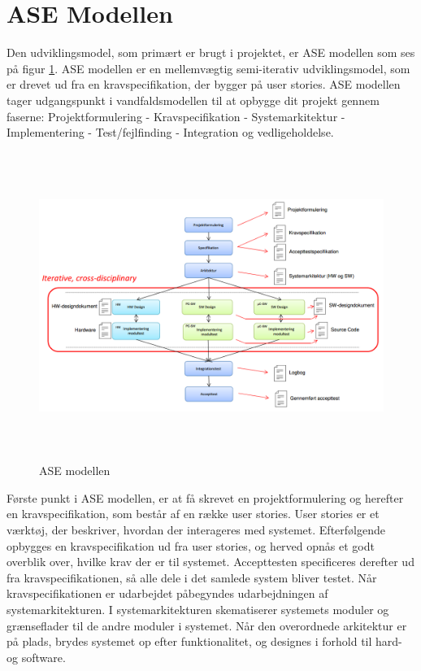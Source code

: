 \section{ASE Modellen} 
\noindent Den udviklingsmodel, som primært er brugt i projektet, er ASE modellen som ses på figur \ref{fig:ASE}. ASE modellen er en mellemvægtig semi-iterativ udviklingsmodel, som er drevet ud fra en kravspecifikation, der bygger på user stories. ASE modellen tager udgangspunkt i vandfaldsmodellen til at opbygge dit projekt gennem faserne: Projektformulering - Kravspecifikation - Systemarkitektur -  Implementering -  Test/fejlfinding -  Integration og vedligeholdelse.

\begin{figure} [!ht]
	\begin{center}
		\includegraphics[height=10cm, width=12cm]{Projektbeskrivelse/subpages/ASEModellen.png}
	\end{center}
	\caption{ASE modellen \cite{VejlUdvikl}}
	\label{fig:ASE}
\end{figure}

\noindent Første punkt i ASE modellen, er at få skrevet en projektformulering og herefter en kravspecifikation, som består af en række user stories. User stories er et værktøj, der beskriver, hvordan der interageres med systemet. Efterfølgende opbygges en kravspecifikation ud fra user stories, og herved opnås et godt overblik over, hvilke krav der er til systemet. Accepttesten specificeres derefter ud fra kravspecifikationen, så alle dele i det samlede system bliver testet.
Når kravspecifikationen er udarbejdet påbegyndes udarbejdningen af systemarkitekturen. I systemarkitekturen skematiserer systemets moduler og grænseflader til de andre moduler i systemet. Når den overordnede arkitektur er på plads, brydes systemet op efter funktionalitet, og designes i forhold til hard- og software. \\


